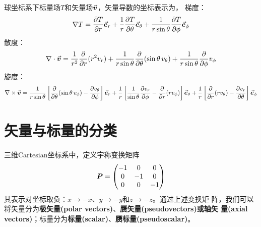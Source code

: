 球坐标系下标量场$T$和矢量场$\vec{\bm{v}}$，矢量导数的坐标表示为，\newline
梯度：
\begin{equation}
    \nabla T = \frac{\partial T}{\partial r} \vec{\bm{e}}_r
              +\frac{1}{r} \frac{\partial T}{\partial \theta} \vec{\bm{e}}_{\theta}
              +\frac{1}{r\sin{\theta}}\frac{\partial T}{\partial \phi} \vec{\bm{e}}_{\phi}
    \label{eq:sphere-gradient}
\end{equation}
散度：
\begin{equation}
    \nabla \cdot \vec{\bm{v}} = \frac{1}{r^2} \frac{\partial}{\partial r}(r^2 v_r)
      + \frac{1}{r\sin{\theta}}\frac{\partial}{\partial\theta}(\sin{\theta}\, v_{\theta})
      + \frac{1}{r\sin{\theta}}\frac{\partial}{\partial\phi} v_{\phi}
    \label{eq:sphere-divergence}
\end{equation}
旋度：
\begin{equation}
    \nabla \times \vec{\bm{v}} =
    \frac{1}{r\sin{\theta}}\left[ \frac{\partial}{\partial\theta}(\sin{\theta}\,v_{\phi}) 
                      - \frac{\partial v_{\theta}}{\partial\phi}\right] \vec{\bm{e}}_r
     +\frac{1}{r} \left[ \frac{1}{\sin{\theta}} \frac{\partial v_{r}}{\partial \phi} 
                 - \frac{\partial}{\partial r}(r v_{\phi})\right] \vec{\bm{e}}_{\theta}
     +\frac{1}{r}\left[\frac{\partial}{\partial r}(r v_{\theta})
                 - \frac{\partial v_{r}}{{\partial \theta}} \right] \vec{\bm{e}}_{\phi}
    \label{eq:sphere-curl}
\end{equation}

\section{矢量与标量的分类}
三维Cartesian坐标系中，定义宇称变换矩阵
\begin{equation}
    \bm{P} = \begin{pmatrix}
        -1  &   0   &   0   \\
         0  &  -1   &   0   \\
         0  &   0   &  -1 
    \end{pmatrix}
    \label{eq:inverse-matrix}
\end{equation}
其表示对坐标取负：$x\rightarrow -x$、$y\rightarrow -y$和$z\rightarrow -z$。通过上述变换矩
阵，我们可以将矢量分为\textbf{极矢量(polar vectors)}、\textbf{赝矢量(pseudovectors)或轴矢
量(axial vectors)}；标量分为\textbf{标量(scalar)}、\textbf{赝标量(pseudoscalar)}。

